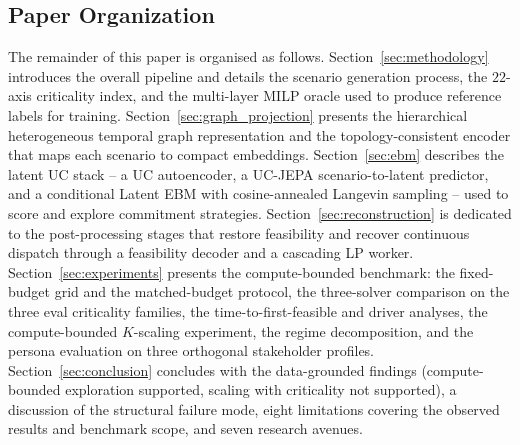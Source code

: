\documentclass{article}
\begin{document}
\subsection{Paper Organization}
The remainder of this paper is organised as follows. Section~\ref{sec:methodology} introduces the overall pipeline and details the scenario generation process, the $22$-axis criticality index, and the multi-layer MILP oracle used to produce reference labels for training. Section~\ref{sec:graph_projection} presents the hierarchical heterogeneous temporal graph representation and the topology-consistent encoder that maps each scenario to compact embeddings. Section~\ref{sec:ebm} describes the latent UC stack -- a UC autoencoder, a UC-JEPA scenario-to-latent predictor, and a conditional Latent EBM with cosine-annealed Langevin sampling -- used to score and explore commitment strategies. Section~\ref{sec:reconstruction} is dedicated to the post-processing stages that restore feasibility and recover continuous dispatch through a feasibility decoder and a cascading LP worker. Section~\ref{sec:experiments} presents the compute-bounded benchmark: the fixed-budget grid and the matched-budget protocol, the three-solver comparison on the three eval criticality families, the time-to-first-feasible and driver analyses, the compute-bounded $K$-scaling experiment, the regime decomposition, and the persona evaluation on three orthogonal stakeholder profiles. Section~\ref{sec:conclusion} concludes with the data-grounded findings (compute-bounded exploration supported, scaling with criticality not supported), a discussion of the structural failure mode, eight limitations covering the observed results and benchmark scope, and seven research avenues.
\end{document}
